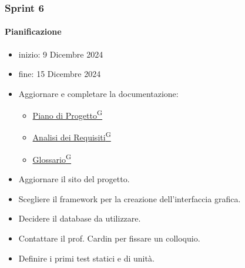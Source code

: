 \documentclass{article}
\begin{document}
            \subsubsection{Sprint 6}
                \paragraph{Pianificazione}
                \begin{itemize}
                    \item inizio: 9 Dicembre 2024
                    \item fine: 15 Dicembre 2024
                \end{itemize}
                \begin{itemize}
                    \item Aggiornare e completare la documentazione:
                    \begin{itemize}
                        \item \href{https://code7crusaders.github.io/docs/RTB/documentazione_interna/glossario.html#piano-di-progetto}{Piano di Progetto\textsuperscript{G}}
                        \item \href{https://code7crusaders.github.io/docs/RTB/documentazione_interna/glossario.html#analisi-dei-requisiti}{Analisi dei Requisiti\textsuperscript{G}}
                        \item \href{https://code7crusaders.github.io/docs/RTB/documentazione_interna/glossario.html#glossario}{Glossario\textsuperscript{G}}
                    \end{itemize}
                    \item Aggiornare il sito del progetto.
                    \item Scegliere il framework per la creazione dell'interfaccia grafica.
                    \item Decidere il database da utilizzare.
                    \item Contattare il prof. Cardin per fissare un colloquio.
                    \item Definire i primi test statici e di unità.
                \end{itemize}

\end{document}
